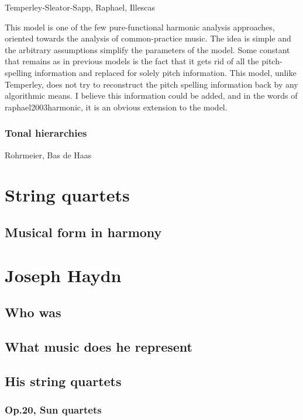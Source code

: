     Temperley-Sleator-Sapp, Raphael, Illescas

    This model is one of the few pure-functional harmonic analysis approaches, oriented towards the analysis of common-practice music. The idea is simple and the arbitrary assumptions simplify the parameters of the model. Some constant that remains as in previous models is the fact that it gets rid of all the pitch-spelling information and replaced for solely pitch information. This model, unlike Temperley, does not try to reconstruct the pitch spelling information back by any algorithmic means. I believe this information could be added, and in the words of raphael2003harmonic, it is an obvious extension to the model.

    \subsubsection{Tonal hierarchies}
    Rohrmeier, Bas de Haas
\section{String quartets}
  \subsection{Musical form in harmony}
\section{Joseph Haydn}
  \subsection{Who was}
  \subsection{What music does he represent}
  \subsection{His string quartets}
    \subsubsection{Op.20, Sun quartets}

\newpage
